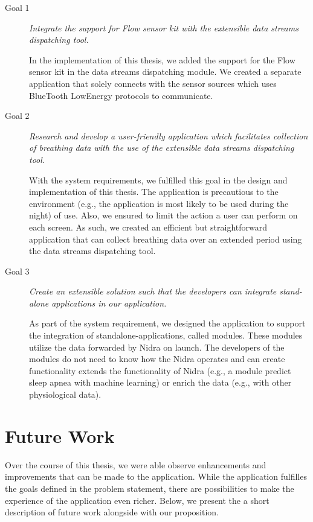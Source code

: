 \begin{description}
    \item[Goal 1] \textit{Integrate the support for Flow sensor kit with the extensible data streams dispatching tool.}
    
    In the implementation of this thesis, we added the support for the Flow sensor kit in the data streams dispatching module. We created a separate application that solely connects with the sensor sources which uses BlueTooth LowEnergy protocols to communicate.

    \item[Goal 2] \textit{Research and develop a user-friendly application which facilitates collection of breathing data with the use of the extensible data streams dispatching tool.}
    
    With the system requirements, we fulfilled this goal in the design and implementation of this thesis. The application is precautious to the environment (e.g., the application is most likely to be used during the night) of use. Also, we ensured to limit the action a user can perform on each screen. As such, we created an efficient but straightforward application that can collect breathing data over an extended period using the data streams dispatching tool. 
    
    \item[Goal 3] \textit{Create an extensible solution such that the developers can integrate stand-alone applications in our application.}

    As part of the system requirement, we designed the application to support the integration of standalone-applications, called modules. These modules utilize the data forwarded by Nidra on launch. The developers of the modules do not need to know how the Nidra operates and can create functionality extends the functionality of Nidra (e.g., a module predict sleep apnea with machine learning) or enrich the data (e.g., with other physiological data).   
\end{description}


\section{Future Work}
Over the course of this thesis, we were able observe enhancements and improvements that can be made to the application. While the application fulfilles the goals defined in the problem statement, there are possibilities to make the experience of the application even richer. Below, we present the a short description of future work alongside with our proposition. 


